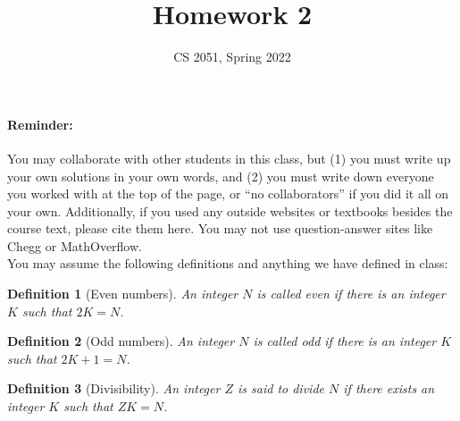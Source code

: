 \documentclass{article}
\newtheorem{definition}{Definition}[section]
\begin{document}
\title{Homework 2}
\author{CS 2051, Spring 2022}
\date{}
\maketitle

\paragraph{Reminder:} You may collaborate with other students in this
class, but (1) you must write up your own solutions in your own words, and (2) 
you must write down everyone you worked with at the top of the page, or ``no 
collaborators'' if you did it all on your own. Additionally, if you used any outside websites or textbooks besides the course text, please cite them here. You may not use question-answer sites like Chegg or MathOverflow. \\

You may assume the following definitions and anything we have defined in class:

\begin{definition}[Even numbers]
An integer $N$ is called even if there is an integer $K$ such that $2K = N$.
\end{definition}

\begin{definition}[Odd numbers]
An integer $N$ is called odd if there is an integer $K$ such that $2K + 1 = N$.
\end{definition}

\begin{definition}[Divisibility]
An integer $Z$ is said to divide $N$ if there exists an integer $K$ such that $ZK = N$.
\end{definition}


\hrulefill
\end{document}
